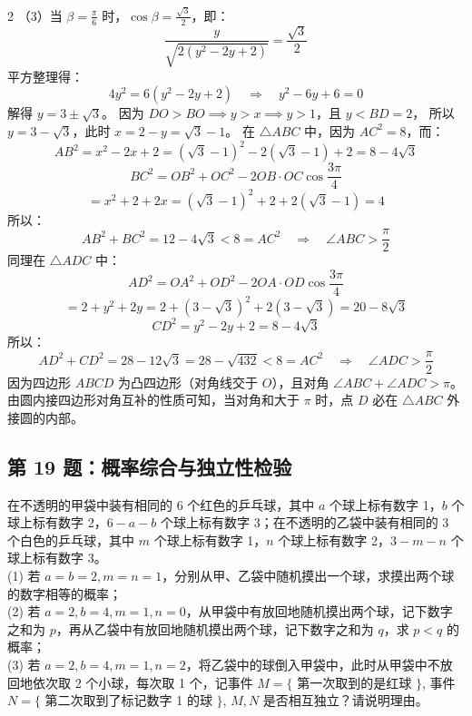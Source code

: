 \documentclass[11pt,a4paper]{ctexart}
\begin{document}
\begin{paracol}{2}
{（3）当 $\beta = \frac{\pi}{6}$ 时，$\cos\beta = \frac{\sqrt{3}}{2}$，即：
$$\frac{y}{\sqrt{2(y^2-2y+2)}} = \frac{\sqrt{3}}{2}$$
平方整理得：
$$4y^2 = 6(y^2-2y+2) \quad\Longrightarrow\quad y^2 - 6y + 6 = 0$$
解得 $y = 3 \pm \sqrt{3}$。
因为 $DO > BO \implies y > x \implies y > 1$，且 $y < BD = 2$，
所以 $y = 3 - \sqrt{3}$，此时 $x = 2-y = \sqrt{3}-1$。
在 $\triangle ABC$ 中，因为 $AC^2 = 8$，而：
$$AB^2 = x^2-2x+2 = (\sqrt{3}-1)^2 - 2(\sqrt{3}-1) + 2 = 8 - 4\sqrt{3}$$
$$BC^2 = OB^2 + OC^2 - 2OB \cdot OC \cos\frac{3\pi}{4}$$
$$= x^2 + 2 + 2x = (\sqrt{3}-1)^2 + 2 + 2(\sqrt{3}-1) = 4$$
所以：
$$AB^2 + BC^2 = 12 - 4\sqrt{3} < 8 = AC^2 \quad\Longrightarrow\quad \angle ABC > \frac{\pi}{2}$$
同理在 $\triangle ADC$ 中：
$$AD^2 = OA^2 + OD^2 - 2OA \cdot OD \cos\frac{3\pi}{4}$$
$$= 2 + y^2 + 2y = 2 + (3-\sqrt{3})^2 + 2(3-\sqrt{3}) = 20 - 8\sqrt{3}$$
$$CD^2 = y^2-2y+2 = 8-4\sqrt{3}$$
所以：
$$AD^2 + CD^2 = 28 - 12\sqrt{3} = 28 - \sqrt{432} < 8 = AC^2 \quad\Longrightarrow\quad \angle ADC > \frac{\pi}{2}$$
因为四边形 $ABCD$ 为凸四边形（对角线交于 $O$），且对角 $\angle ABC + \angle ADC > \pi$。
由圆内接四边形对角互补的性质可知，当对角和大于 $\pi$ 时，点 $D$ 必在 $\triangle ABC$ 外接圆的内部。
}
\switchcolumn
{}
\end{paracol}

\newpage

\subsection*{第 19 题：概率综合与独立性检验}
在不透明的甲袋中装有相同的 6 个红色的乒乓球，其中 $a$ 个球上标有数字 1，$b$ 个球上标有数字 2，$6-a-b$ 个球上标有数字 3；在不透明的乙袋中装有相同的 3 个白色的乒乓球，其中 $m$ 个球上标有数字 1，$n$ 个球上标有数字 2，$3-m-n$ 个球上标有数字 3。\\
(1) 若 $a=b=2, m=n=1$，分别从甲、乙袋中随机摸出一个球，求摸出两个球的数字相等的概率；\\
(2) 若 $a=2, b=4, m=1, n=0$，从甲袋中有放回地随机摸出两个球，记下数字之和为 $p$，再从乙袋中有放回地随机摸出两个球，记下数字之和为 $q$，求 $p < q$ 的概率；\\
(3) 若 $a=2, b=4, m=1, n=2$，将乙袋中的球倒入甲袋中，此时从甲袋中不放回地依次取 2 个小球，每次取 1 个，记事件 $M = \{$ 第一次取到的是红球 $\}$, 事件 $N = \{$ 第二次取到了标记数字 1 的球 $\}$, $M, N$ 是否相互独立？请说明理由。
\end{document}

